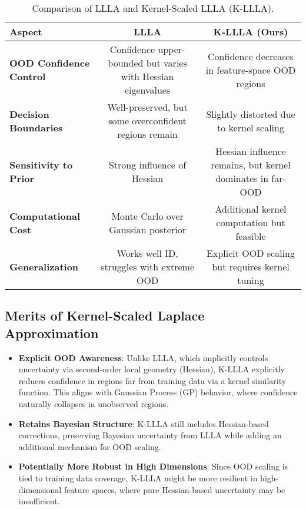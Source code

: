\documentclass{article}
\begin{document}
\begin{table}[h]
    \centering
    \begin{tabular}{lcc}
        \toprule
        Aspect & LLLA & K-LLLA (Ours) \\
        \midrule
        \textbf{OOD Confidence Control} & Confidence upper-bounded but varies with Hessian eigenvalues & Confidence decreases in feature-space OOD regions \\
        \textbf{Decision Boundaries} & Well-preserved, but some overconfident regions remain & Slightly distorted due to kernel scaling \\
        \textbf{Sensitivity to Prior} & Strong influence of Hessian & Hessian influence remains, but kernel dominates in far-OOD \\
        \textbf{Computational Cost} & Monte Carlo over Gaussian posterior & Additional kernel computation but feasible \\
        \textbf{Generalization} & Works well ID, struggles with extreme OOD & Explicit OOD scaling but requires kernel tuning \\
        \bottomrule
    \end{tabular}
    \caption{Comparison of LLLA and Kernel-Scaled LLLA (K-LLLA).}
    \label{tab:comparison}
\end{table}

\subsection{Merits of Kernel-Scaled Laplace Approximation}
\begin{itemize}
    \item \textbf{Explicit OOD Awareness}: Unlike LLLA, which implicitly controls uncertainty via second-order local geometry (Hessian), K-LLLA explicitly reduces confidence in regions far from training data via a kernel similarity function. This aligns with Gaussian Process (GP) behavior, where confidence naturally collapses in unobserved regions.
    \item \textbf{Retains Bayesian Structure}: K-LLLA still includes Hessian-based corrections, preserving Bayesian uncertainty from LLLA while adding an additional mechanism for OOD scaling.
    \item \textbf{Potentially More Robust in High Dimensions}: Since OOD scaling is tied to training data coverage, K-LLLA might be more resilient in high-dimensional feature spaces, where pure Hessian-based uncertainty may be insufficient.
\end{itemize}
\end{document}

